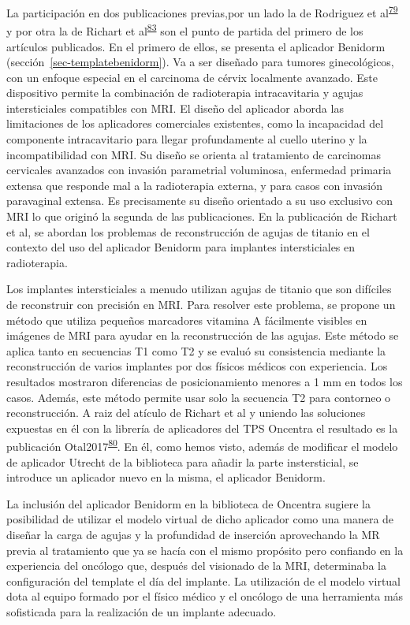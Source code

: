 \documentclass[
  a4paper,
]{scrreprt}
\begin{document}
La participación en dos publicaciones previas,por un lado la de
Rodriguez et
al\textsuperscript{\protect\hyperlink{ref-villalba2015}{79}} y por otra
la de Richart et
al\textsuperscript{\protect\hyperlink{ref-richart2015}{83}} son el punto
de partida del primero de los artículos publicados. En el primero de
ellos, se presenta el aplicador Benidorm
(sección~\ref{sec-templatebenidorm}). Va a ser diseñado para tumores
ginecológicos, con un enfoque especial en el carcinoma de cérvix
localmente avanzado. Este dispositivo permite la combinación de
radioterapia intracavitaria y agujas intersticiales compatibles con MRI.
El diseño del aplicador aborda las limitaciones de los aplicadores
comerciales existentes, como la incapacidad del componente
intracavitario para llegar profundamente al cuello uterino y la
incompatibilidad con MRI. Su diseño se orienta al tratamiento de
carcinomas cervicales avanzados con invasión parametrial voluminosa,
enfermedad primaria extensa que responde mal a la radioterapia externa,
y para casos con invasión paravaginal extensa. Es precisamente su diseño
orientado a su uso exclusivo con MRI lo que originó la segunda de las
publicaciones. En la publicación de Richart et al, se abordan los
problemas de reconstrucción de agujas de titanio en el contexto del uso
del aplicador Benidorm para implantes intersticiales en radioterapia.

Los implantes intersticiales a menudo utilizan agujas de titanio que son
difíciles de reconstruir con precisión en MRI. Para resolver este
problema, se propone un método que utiliza pequeños marcadores vitamina
A fácilmente visibles en imágenes de MRI para ayudar en la
reconstrucción de las agujas. Este método se aplica tanto en secuencias
T1 como T2 y se evaluó su consistencia mediante la reconstrucción de
varios implantes por dos físicos médicos con experiencia. Los resultados
mostraron diferencias de posicionamiento menores a 1 mm en todos los
casos. Además, este método permite usar solo la secuencia T2 para
contorneo o reconstrucción. A raiz del atículo de Richart et al y
uniendo las soluciones expuestas en él con la librería de aplicadores
del TPS Oncentra el resultado es la publicación
Otal2017\textsuperscript{\protect\hyperlink{ref-otal2017}{80}}. En él,
como hemos visto, además de modificar el modelo de aplicador Utrecht de
la biblioteca para añadir la parte instersticial, se introduce un
aplicador nuevo en la misma, el aplicador Benidorm.

La inclusión del aplicador Benidorm en la biblioteca de Oncentra sugiere
la posibilidad de utilizar el modelo virtual de dicho aplicador como una
manera de diseñar la carga de agujas y la profundidad de inserción
aprovechando la MR previa al tratamiento que ya se hacía con el mismo
propósito pero confiando en la experiencia del oncólogo que, después del
visionado de la MRI, determinaba la configuración del template el día
del implante. La utilización de el modelo virtual dota al equipo formado
por el físico médico y el oncólogo de una herramienta más sofisticada
para la realización de un implante adecuado.
\end{document}
